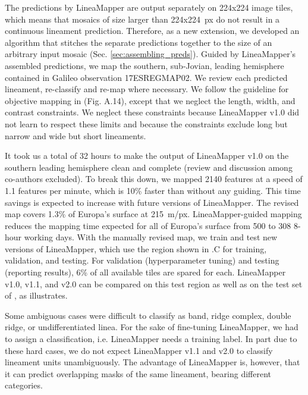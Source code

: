 The predictions by LineaMapper are output separately on 224x224 image tiles, which means that mosaics of size larger than 224x224~px do not result in a continuous lineament prediction. Therefore, as a new extension, we developed an algorithm that stitches the separate predictions together to the size of an arbitrary input mosaic (Sec. \ref{sec:assembling_preds}). 
Guided by LineaMapper’s assembled predictions, we map the southern, sub-Jovian, leading hemisphere contained in Galileo observation 17ESREGMAP02. We review each predicted lineament, re-classify and re-map where necessary. We follow the guideline for objective mapping in (Fig. A.14), except that we neglect the length, width, and contrast constraints. We neglect these constraints because LineaMapper v1.0 did not learn to respect these limits and because the constraints exclude long but narrow and wide but short lineaments.

It took us a total of 32 hours to make the output of LineaMapper v1.0 on the southern leading hemisphere clean and complete (review and discussion among co-authors excluded). To break this down, we mapped 2140 features at a speed of 1.1 features per minute, which is 10\% faster than without any guiding. This time savings is expected to increase with future versions of LineaMapper. The revised map covers 1.3\% of Europa's surface at 215~m/px. LineaMapper-guided mapping reduces the mapping time expected for all of Europa's surface from 500 to 308 8-hour working days. 
With the manually revised map, we train and test new versions of LineaMapper, which use the region shown in .C for training, validation, and testing. For validation (hyperparameter tuning) and testing (reporting results), 6\% of all available tiles are spared for each. LineaMapper v1.0, v1.1, and v2.0 can be compared on this test region as well as on the test set of , as  illustrates.

Some ambiguous cases were difficult to classify as band, ridge complex, double ridge, or undifferentiated linea. For the sake of fine-tuning LineaMapper, we had to assign a classification, i.e. LineaMapper needs a training label. In part due to these hard cases, we do not expect LineaMapper v1.1 and v2.0 to classify lineament units unambiguously. The advantage of LineaMapper is, however, that it can predict overlapping masks of the same lineament, bearing different categories. 


